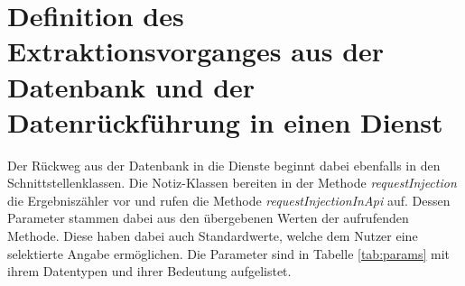 \section{Definition des Extraktionsvorganges aus der Datenbank und der Datenrückführung in einen Dienst}

Der Rückweg aus der Datenbank in die Dienste beginnt dabei ebenfalls in den Schnittstellenklassen. Die Notiz-Klassen bereiten in der Methode \textit{requestInjection} die Ergebniszähler vor und rufen die Methode \textit{requestInjectionInApi} auf. Dessen Parameter stammen dabei aus den übergebenen Werten der aufrufenden Methode. Diese haben dabei auch Standardwerte, welche dem Nutzer eine selektierte Angabe ermöglichen. Die Parameter sind in Tabelle \ref{tab:params} mit ihrem Datentypen und ihrer Bedeutung aufgelistet.

